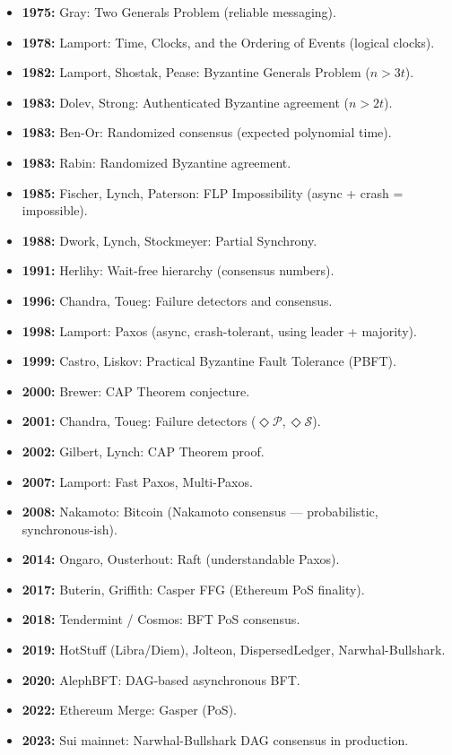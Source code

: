 \begin{itemize}
\item \textbf{1975:} Gray: Two Generals Problem (reliable messaging).
\item \textbf{1978:} Lamport: Time, Clocks, and the Ordering of Events (logical clocks).
\item \textbf{1982:} Lamport, Shostak, Pease: Byzantine Generals Problem ($n > 3t$).
\item \textbf{1983:} Dolev, Strong: Authenticated Byzantine agreement ($n > 2t$).
\item \textbf{1983:} Ben-Or: Randomized consensus (expected polynomial time).
\item \textbf{1983:} Rabin: Randomized Byzantine agreement.
\item \textbf{1985:} Fischer, Lynch, Paterson: FLP Impossibility (async + crash = impossible).
\item \textbf{1988:} Dwork, Lynch, Stockmeyer: Partial Synchrony.
\item \textbf{1991:} Herlihy: Wait-free hierarchy (consensus numbers).
\item \textbf{1996:} Chandra, Toueg: Failure detectors and consensus.
\item \textbf{1998:} Lamport: Paxos (async, crash-tolerant, using leader + majority).
\item \textbf{1999:} Castro, Liskov: Practical Byzantine Fault Tolerance (PBFT).
\item \textbf{2000:} Brewer: CAP Theorem conjecture.
\item \textbf{2001:} Chandra, Toueg: Failure detectors ($\Diamond \mathcal{P}, \Diamond \mathcal{S}$).
\item \textbf{2002:} Gilbert, Lynch: CAP Theorem proof.
\item \textbf{2007:} Lamport: Fast Paxos, Multi-Paxos.
\item \textbf{2008:} Nakamoto: Bitcoin (Nakamoto consensus — probabilistic, synchronous-ish).
\item \textbf{2014:} Ongaro, Ousterhout: Raft (understandable Paxos).
\item \textbf{2017:} Buterin, Griffith: Casper FFG (Ethereum PoS finality).
\item \textbf{2018:} Tendermint / Cosmos: BFT PoS consensus.
\item \textbf{2019:} HotStuff (Libra/Diem), Jolteon, DispersedLedger, Narwhal-Bullshark.
\item \textbf{2020:} AlephBFT: DAG-based asynchronous BFT.
\item \textbf{2022:} Ethereum Merge: Gasper (PoS).
\item \textbf{2023:} Sui mainnet: Narwhal-Bullshark DAG consensus in production.
\end{itemize}

